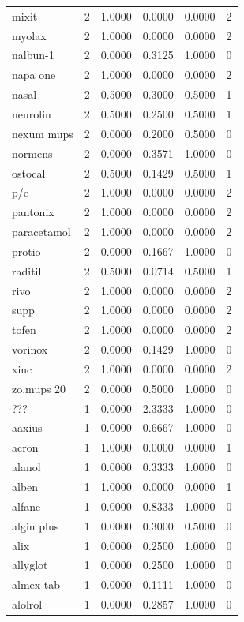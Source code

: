 \begin{longtable}{p{3.0cm}rrrrr}
mixit & 2 & 1.0000 & 0.0000 & 0.0000 & 2 \\
myolax & 2 & 1.0000 & 0.0000 & 0.0000 & 2 \\
nalbun-1 & 2 & 0.0000 & 0.3125 & 1.0000 & 0 \\
napa one & 2 & 1.0000 & 0.0000 & 0.0000 & 2 \\
nasal & 2 & 0.5000 & 0.3000 & 0.5000 & 1 \\
neurolin & 2 & 0.5000 & 0.2500 & 0.5000 & 1 \\
nexum mups & 2 & 0.0000 & 0.2000 & 0.5000 & 0 \\
normens & 2 & 0.0000 & 0.3571 & 1.0000 & 0 \\
ostocal & 2 & 0.5000 & 0.1429 & 0.5000 & 1 \\
p/c & 2 & 1.0000 & 0.0000 & 0.0000 & 2 \\
pantonix & 2 & 1.0000 & 0.0000 & 0.0000 & 2 \\
paracetamol & 2 & 1.0000 & 0.0000 & 0.0000 & 2 \\
protio & 2 & 0.0000 & 0.1667 & 1.0000 & 0 \\
raditil & 2 & 0.5000 & 0.0714 & 0.5000 & 1 \\
rivo & 2 & 1.0000 & 0.0000 & 0.0000 & 2 \\
supp & 2 & 1.0000 & 0.0000 & 0.0000 & 2 \\
tofen & 2 & 1.0000 & 0.0000 & 0.0000 & 2 \\
vorinox & 2 & 0.0000 & 0.1429 & 1.0000 & 0 \\
xinc & 2 & 1.0000 & 0.0000 & 0.0000 & 2 \\
zo.mups 20 & 2 & 0.0000 & 0.5000 & 1.0000 & 0 \\
??? & 1 & 0.0000 & 2.3333 & 1.0000 & 0 \\
aaxius & 1 & 0.0000 & 0.6667 & 1.0000 & 0 \\
acron & 1 & 1.0000 & 0.0000 & 0.0000 & 1 \\
alanol & 1 & 0.0000 & 0.3333 & 1.0000 & 0 \\
alben & 1 & 1.0000 & 0.0000 & 0.0000 & 1 \\
alfane & 1 & 0.0000 & 0.8333 & 1.0000 & 0 \\
algin plus & 1 & 0.0000 & 0.3000 & 0.5000 & 0 \\
alix & 1 & 0.0000 & 0.2500 & 1.0000 & 0 \\
allyglot & 1 & 0.0000 & 0.2500 & 1.0000 & 0 \\
almex tab & 1 & 0.0000 & 0.1111 & 1.0000 & 0 \\
alolrol & 1 & 0.0000 & 0.2857 & 1.0000 & 0 \\

\end{longtable}
